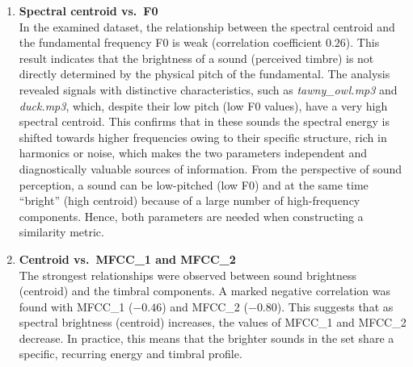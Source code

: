 \documentclass[preprint,12pt]{elsarticle}
\begin{document}
\begin{enumerate}[label=\roman*.]
    \item \textbf{Spectral centroid vs.\ F0}\\
    In the examined dataset, the relationship between the spectral centroid and the fundamental frequency F0 is weak (correlation coefficient $0.26$). This result indicates that the brightness of a sound (perceived timbre) is not directly determined by the physical pitch of the fundamental. The analysis revealed signals with distinctive characteristics, such as \textit{tawny\_owl.mp3} and \textit{duck.mp3}, which, despite their low pitch (low F0 values), have a very high spectral centroid. This confirms that in these sounds the spectral energy is shifted towards higher frequencies owing to their specific structure, rich in harmonics or noise, which makes the two parameters independent and diagnostically valuable sources of information. From the perspective of sound perception, a sound can be low-pitched (low F0) and at the same time ``bright'' (high centroid) because of a large number of high-frequency components. Hence, both parameters are needed when constructing a similarity metric.

    \item \textbf{Centroid vs.\ MFCC\_1 and MFCC\_2} \\
    The strongest relationships were observed between sound brightness (centroid) and the timbral components. A marked negative correlation was found with MFCC\_1 ($-0.46$) and MFCC\_2 ($-0.80$). This suggests that as spectral brightness (centroid) increases, the values of MFCC\_1 and MFCC\_2 decrease. In practice, this means that the brighter sounds in the set share a specific, recurring energy and timbral profile.



\end{enumerate}
\end{document}
